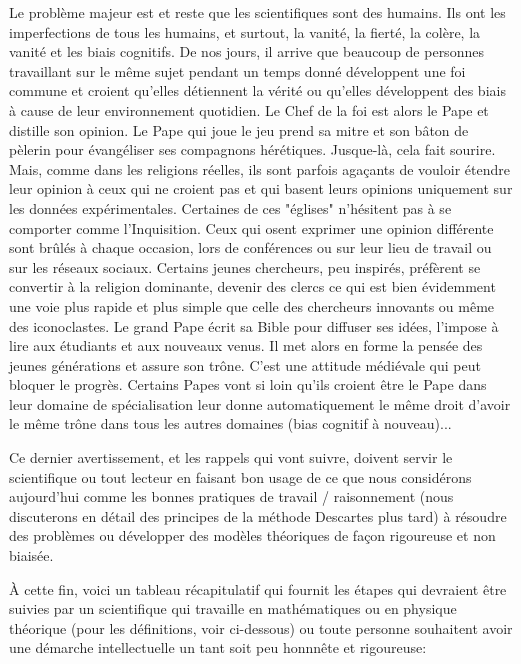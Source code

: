 	Le problème majeur est et reste que les scientifiques sont des humains. Ils ont les imperfections de tous les humains, et surtout, la vanité, la fierté, la colère, la vanité et les biais cognitifs. De nos jours, il arrive que beaucoup de personnes travaillant sur le même sujet pendant un temps donné développent une foi commune et croient qu'elles détiennent la vérité ou qu'elles développent des biais à cause de leur environnement quotidien. Le Chef de la foi est alors le Pape et distille son opinion. Le Pape qui joue le jeu prend sa mitre et son bâton de pèlerin pour évangéliser ses compagnons hérétiques. Jusque-là, cela fait sourire. Mais, comme dans les religions réelles, ils sont parfois agaçants de vouloir étendre leur opinion à ceux qui ne croient pas et qui basent leurs opinions uniquement sur les données expérimentales. Certaines de ces "églises" n'hésitent pas à se comporter comme l'Inquisition. Ceux qui osent exprimer une opinion différente sont brûlés à chaque occasion, lors de conférences ou sur leur lieu de travail ou sur les réseaux sociaux. Certains jeunes chercheurs, peu inspirés, préfèrent se convertir à la religion dominante, devenir des clercs ce qui est bien évidemment une voie plus rapide et plus simple que celle des chercheurs innovants ou même des iconoclastes. Le grand Pape écrit sa Bible pour diffuser ses idées, l'impose à lire aux étudiants et aux nouveaux venus. Il met alors en forme la pensée des jeunes générations et assure son trône. C'est une attitude médiévale qui peut bloquer le progrès. Certains Papes vont si loin qu'ils croient être le Pape dans leur domaine de spécialisation leur donne automatiquement le même droit d'avoir le même trône dans tous les autres domaines (bias cognitif à nouveau)...
	

	Ce dernier avertissement, et les rappels qui vont suivre, doivent servir le scientifique ou tout lecteur en faisant bon usage de ce que nous considérons aujourd'hui comme les bonnes pratiques de travail / raisonnement (nous discuterons en détail des principes de la méthode Descartes plus tard) à résoudre des problèmes ou développer des modèles théoriques de façon rigoureuse et non biaisée. 

	À cette fin, voici un tableau récapitulatif qui fournit les étapes qui devraient être suivies par un scientifique qui travaille en mathématiques ou en physique théorique (pour les définitions, voir ci-dessous) ou toute personne souhaitent avoir une démarche intellectuelle un tant soit peu honnnête et rigoureuse:


